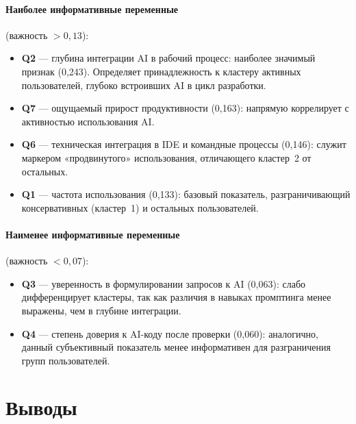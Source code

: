 \documentclass[12pt]{article}
\begin{document}
\paragraph{Наиболее информативные переменные} (важность $> 0{,}13$):
\begin{itemize}
  \item \textbf{Q2} — глубина интеграции AI в рабочий процесс: наиболее
    значимый признак (0{,}243). Определяет принадлежность к кластеру активных
    пользователей, глубоко встроивших AI в цикл разработки.
  \item \textbf{Q7} — ощущаемый прирост продуктивности (0{,}163): напрямую
    коррелирует с активностью использования AI.
  \item \textbf{Q6} — техническая интеграция в IDE и командные процессы
    (0{,}146): служит маркером «продвинутого» использования, отличающего
    кластер~2 от остальных.
  \item \textbf{Q1} — частота использования (0{,}133): базовый показатель,
    разграничивающий консервативных (кластер~1) и остальных пользователей.
\end{itemize}

\paragraph{Наименее информативные переменные} (важность $< 0{,}07$):
\begin{itemize}
  \item \textbf{Q3} — уверенность в формулировании запросов к AI (0{,}063):
    слабо дифференцирует кластеры, так как различия в навыках промптинга менее
    выражены, чем в глубине интеграции.
  \item \textbf{Q4} — степень доверия к AI-коду после проверки (0{,}060):
    аналогично, данный субъективный показатель менее информативен для
    разграничения групп пользователей.
\end{itemize}

\section{Выводы}
\end{document}
